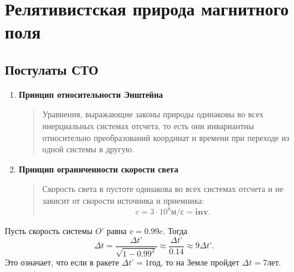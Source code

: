 \chapter{Релятивистская природа магнитного поля}
\section{Постулаты СТО}
    \begin{enumerate}
        \item \textbf{Принцип относительности Энштейна}
            \begin{quote}
                Уравнения, выражающие законы природы одинаковы во всех
                инерциальных системах отсчета, то есть они инвариантны
                относительно преобразований координат и времени при переходе из
                одной системы в другую.
            \end{quote}

    \item \textbf {Принцип ограниченности скорости света}
        \begin{quote}
            Скорость света в пустоте одинакова во всех системах отсчета и не
            зависит от скорости источника и приемника:
            \[
                c = 3\cdot10^8 \text{м/с} = \mathbf{inv}.
            \]
        \end{quote}
    \end{enumerate}

    \begin{comment}
        Пояснения к формуле преобразования временного интервала
        \[
            \Delta t’ = \Delta t\sqrt{1 - \beta^2}.
        \]

        Здесь \( \Delta t’ \) -- время между двумя событиями, происходящими в
        системе \( O’ \) (например, на космическом корабле), измеряемое по часам
        системы \( O’ \) -- \textbf{собственное время}. \( \Delta t \) -- это
        время между двумя этими же событиями, измеряемое по часам системы
        \( O \) (например, на Земле).
    \end{comment}

    \begin{example} 
        Пусть скорость системы \( O’ \) равна \( v = 0.99c \). Тогда 
        \[
            \Delta t = \frac{\Delta t’}{\sqrt{1 - 0.99^2}} \approx
            \frac{\Delta t’}{0.14} \approx 9\Delta t’.
        \]
        Это означает, что если в ракете \( \Delta t’ = 1 \)год, то на Земле
        пройдет \( \Delta t = 7 \)лет.
    \end{example}

